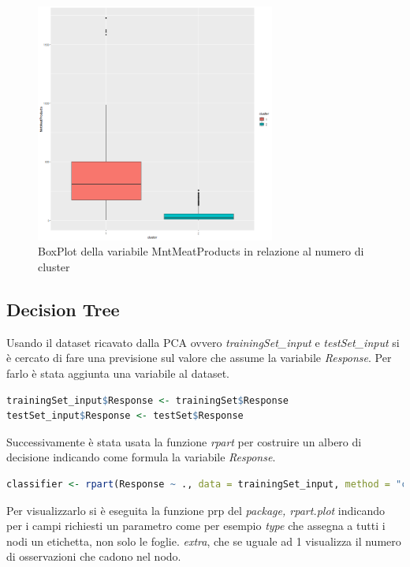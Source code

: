 \documentclass[letterpaper,11pt]{article}
\begin{document}
\begin{figure}[H]
    \centering
    \includegraphics[width=0.7\textwidth]{Img/K-MEANS/KMEANS021.png}
    \caption{BoxPlot della variabile MntMeatProducts in relazione al numero di cluster}
    \label{fig:MntMeatProductsKmeansBoxPlot}
\end{figure}


\newpage
\subsection{Decision Tree}
Usando il dataset ricavato dalla PCA ovvero \textit{trainingSet\_input} e \textit{testSet\_input} si è cercato di fare una previsione sul valore che assume la variabile \textit{Response}. Per farlo è stata aggiunta una variabile al dataset. 

\begin{lstlisting}[language=R]
trainingSet_input$Response <- trainingSet$Response
testSet_input$Response <- testSet$Response
\end{lstlisting}

Successivamente è stata usata la funzione \textit{rpart} per costruire un albero di decisione indicando come formula la variabile \textit{Response}.

\begin{lstlisting}[language=R]
classifier <- rpart(Response ~ ., data = trainingSet_input, method = "class")
\end{lstlisting}

Per visualizzarlo si è eseguita la funzione prp del \textit{package, rpart.plot} indicando per i campi richiesti un parametro come per esempio \textit{type} che assegna a tutti i nodi un etichetta, non solo le foglie. \textit{extra}, che se uguale ad 1 visualizza il numero di osservazioni che cadono nel nodo. 
\end{document}
